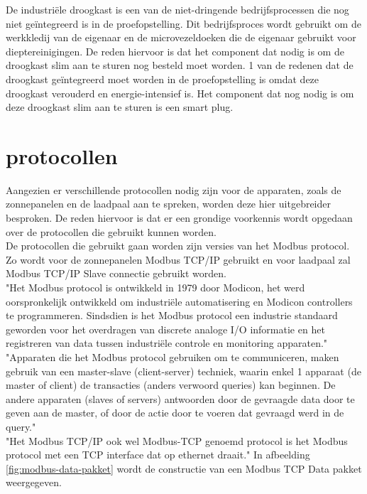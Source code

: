 De industriële droogkast is een van de niet-dringende bedrijfsprocessen die nog niet geïntegreerd is in de proefopstelling. Dit bedrijfsproces wordt gebruikt om de werkkledij van de eigenaar en de microvezeldoeken die de eigenaar gebruikt voor dieptereinigingen. De reden hiervoor is dat het component dat nodig is om de droogkast slim aan te sturen nog besteld moet worden. 1 van de redenen dat de droogkast geïntegreerd moet worden in de proefopstelling is omdat deze droogkast verouderd en energie-intensief is. Het component dat nog nodig is om deze droogkast slim aan te sturen is een smart plug.

\section{protocollen}
\label{sec:stand-van-zaken-protocollen}

Aangezien er verschillende protocollen nodig zijn voor de apparaten, zoals de zonnepanelen en de laadpaal aan te spreken, worden deze hier uitgebreider besproken. De reden hiervoor is dat er een grondige voorkennis wordt opgedaan over de protocollen die gebruikt kunnen worden.\\

De protocollen die gebruikt gaan worden zijn versies van het Modbus protocol. Zo wordt voor de zonnepanelen Modbus TCP/IP gebruikt en voor laadpaal zal Modbus TCP/IP Slave connectie gebruikt worden.\\

"Het Modbus protocol is ontwikkeld in 1979 door Modicon, het werd oorspronkelijk ontwikkeld om industriële automatisering en Modicon controllers te programmeren. Sindsdien is het Modbus protocol een industrie standaard geworden voor het overdragen van discrete analoge I/O informatie en het registreren van data tussen industriële controle en monitoring apparaten." \autocite{Acromag2005} \\

"Apparaten die het Modbus protocol gebruiken om te communiceren, maken gebruik van een master-slave (client-server) techniek, waarin enkel 1 apparaat (de master of client) de transacties (anders verwoord queries) kan beginnen. De andere apparaten (slaves of servers) antwoorden door de gevraagde data door te geven aan de master, of door de actie door te voeren dat gevraagd werd in de query." \autocite{Acromag2005} \\

"Het Modbus TCP/IP ook wel Modbus-TCP genoemd protocol is het Modbus protocol met een TCP interface dat op ethernet draait." \autocite{Acromag2005} In afbeelding \ref{fig:modbus-data-pakket} wordt de constructie van een Modbus TCP Data pakket weergegeven.\\

